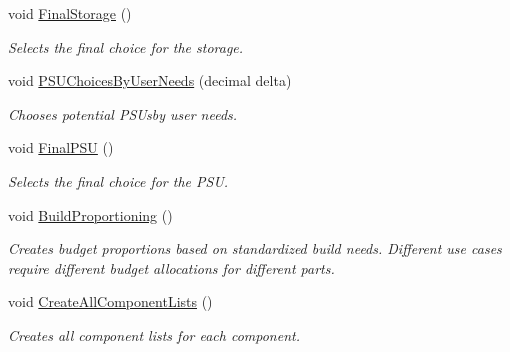 \begin{DoxyCompactItemize}
void \hyperlink{class_business_logic_1_1_build_processor_a9c56c221189ed6bd17ec8ea20593a8c5}{Final\+Storage} ()
\begin{DoxyCompactList}\small\item\em Selects the final choice for the storage. \end{DoxyCompactList}\item 
void \hyperlink{class_business_logic_1_1_build_processor_a202adb3a888d805e5e71e75f67d3f086}{P\+S\+U\+Choices\+By\+User\+Needs} (decimal delta)
\begin{DoxyCompactList}\small\item\em Chooses potential P\+S\+Usby user needs. \end{DoxyCompactList}\item 
void \hyperlink{class_business_logic_1_1_build_processor_aa87a3667f6b2bbc272e864c08ba42364}{Final\+P\+SU} ()
\begin{DoxyCompactList}\small\item\em Selects the final choice for the P\+SU. \end{DoxyCompactList}\item 
void \hyperlink{class_business_logic_1_1_build_processor_a600e948e1baf06c06237742a99a967ff}{Build\+Proportioning} ()
\begin{DoxyCompactList}\small\item\em Creates budget proportions based on standardized build needs. Different use cases require different budget allocations for different parts. \end{DoxyCompactList}\item 
void \hyperlink{class_business_logic_1_1_build_processor_a54da61836d65e0e34a9e2ef76fb1a012}{Create\+All\+Component\+Lists} ()
\begin{DoxyCompactList}\small\item\em Creates all component lists for each component. \end{DoxyCompactList}\end{DoxyCompactItemize}
